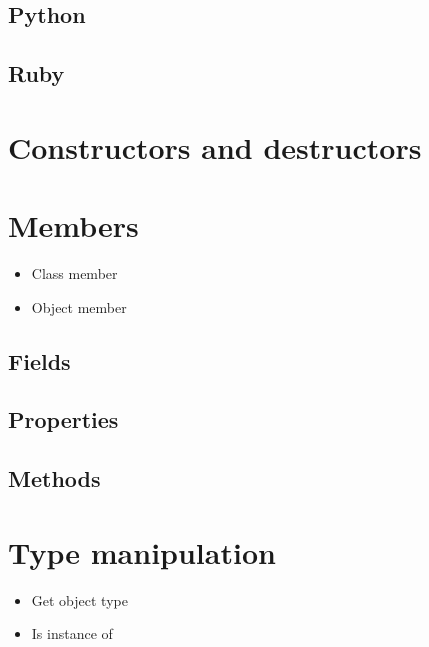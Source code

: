 \documentclass{KodeBook}
\begin{document}


\subsection{Python}



\subsection{Ruby}




\section{Constructors and destructors}



\section{Members}

\begin{itemize}
	\item Class member
	\item Object member
\end{itemize}


\subsection{Fields}


\subsection{Properties}

\subsection{Methods}



\section{Type manipulation}

\begin{itemize}
	\item Get object type
	\item Is instance of
\end{itemize}
\end{document}
